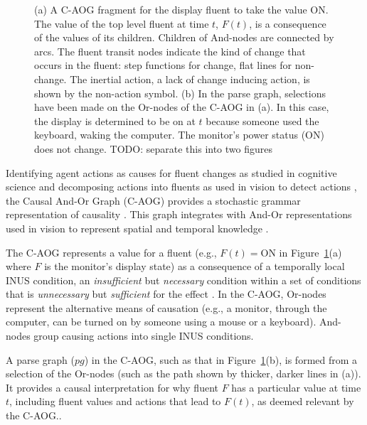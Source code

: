 \documentclass[10pt,journal,letterpaper,compsoc]{IEEEtran}
\begin{document}
\begin{figure}[hbtp]
\centering

\caption{(a) A C-AOG fragment for the display fluent to take the value ON.  The value of the top level fluent at time $t$, $F(t)$, is a consequence of the values of its children.  Children of And-nodes are connected by arcs.  The fluent transit nodes indicate the kind of change that occurs in the fluent: step functions for change, flat lines for non-change.  The inertial action, a lack of change inducing action, is shown by the non-action symbol.  (b) In the parse graph, selections have been made on the Or-nodes of the C-AOG in (a).  In this case, the display is determined to be on at $t$ because someone used the keyboard, waking the computer.  The monitor's power status (ON) does not change.
TODO: separate this into two figures
 \label{fig:causalpg}}
\end{figure}


Identifying agent actions as causes for fluent changes as studied in cognitive science \cite{carey2009origin} and decomposing actions into fluents as used in vision to detect actions \cite{Bobick}, the Causal And-Or Graph (C-AOG) provides a stochastic grammar representation of causality \cite{morrow2012pami}.  This graph integrates with And-Or representations used in vision to represent spatial and temporal knowledge \cite{StochasticGrammar, chen2007rapid, Mingtao}.    

The C-AOG represents a value for a fluent (e.g., $F(t) = \textrm{ON}$ in Figure~\ref{fig:causalpg}(a) where $F$ is the monitor's display state) as a consequence of a temporally local INUS condition, an \textit{insufficient} but \textit{necessary} condition within a set of conditions that is \textit{unnecessary} but \textit{sufficient} for the effect \cite{Mackie}.  In the C-AOG, Or-nodes represent the alternative means of causation (e.g., a monitor, through the computer, can be turned on by someone using a mouse or a keyboard).  And-nodes group causing actions into single INUS conditions.  

A parse graph ($pg$) in the C-AOG, such as that in Figure~\ref{fig:causalpg}(b),  is formed from a selection of the Or-nodes (such as the path shown by thicker, darker lines in (a)).  It provides a causal interpretation for why fluent $F$ has a particular value at time $t$, including fluent values and actions that lead to $F(t)$, as deemed relevant by the C-AOG..  
\end{document}
